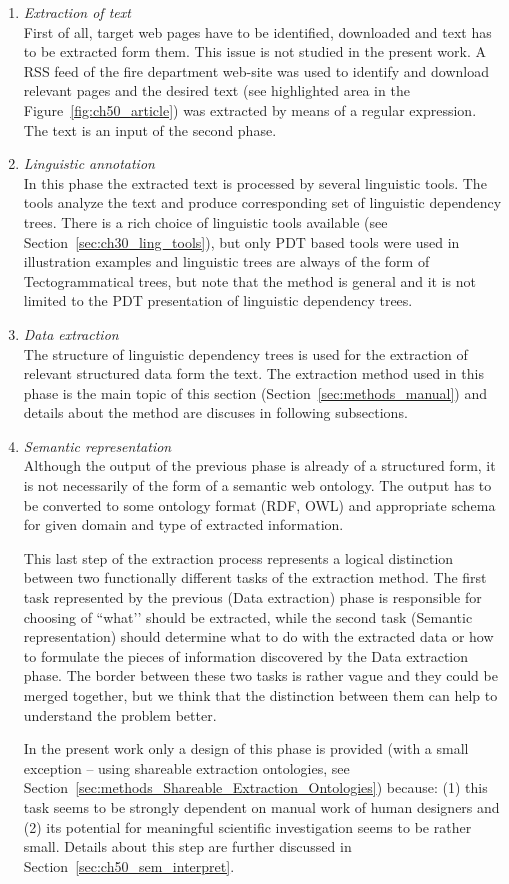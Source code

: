 \begin{enumerate}
\item \emph{Extraction of text} \\ First of all, target web pages have to be identified, downloaded and text has to be extracted form them. This issue is not studied in the present work. A RSS feed of the fire department web-site was used to identify and download relevant pages and the desired text (see highlighted area in the Figure~\ref{fig:ch50_article}) was extracted by means of a regular expression. The text is an input of the second phase.

\item \emph{Linguistic annotation} \\ In this phase the extracted text is processed by several linguistic tools. The tools analyze the text and produce corresponding set of linguistic dependency trees. There is a rich choice of linguistic tools available (see Section~\ref{sec:ch30_ling_tools}), but only PDT based tools were used in illustration examples and linguistic trees are always of the form of Tectogrammatical trees, but note that the method is general and it is not limited to the PDT presentation of linguistic dependency trees.

\item \emph{Data extraction} \\ The structure of linguistic dependency trees is used for the extraction of relevant structured data form the text. The extraction method used in this phase is the main topic of this section (Section~\ref{sec:methods_manual}) and details about the method are discuses in following subsections.

\item \emph{Semantic representation} \\ Although the output of the previous phase is already of a structured form, it is not necessarily of the form of a semantic web ontology. The output has to be converted to some ontology format (RDF, OWL) and appropriate schema for given domain and type of extracted information. 

This last step of the extraction process represents a logical distinction between two functionally different tasks of the extraction method. The first task represented by the previous (Data extraction) phase is responsible for choosing of ``what’’ should be extracted, while the second task (Semantic representation) should determine what to do with the extracted data or how to formulate the pieces of information discovered by the Data extraction phase. The border between these two tasks is rather vague and they could be merged together, but we think that the distinction between them can help to understand the problem better.


In the present work only a design of this phase is provided (with a small exception -- using shareable extraction ontologies, see Section~\ref{sec:methods_Shareable_Extraction_Ontologies}) because: (1) this task seems to be strongly dependent on manual work of human designers and (2) its potential for meaningful scientific investigation seems to be rather small. Details about this step are further discussed in Section~\ref{sec:ch50_sem_interpret}.
\end{enumerate}
